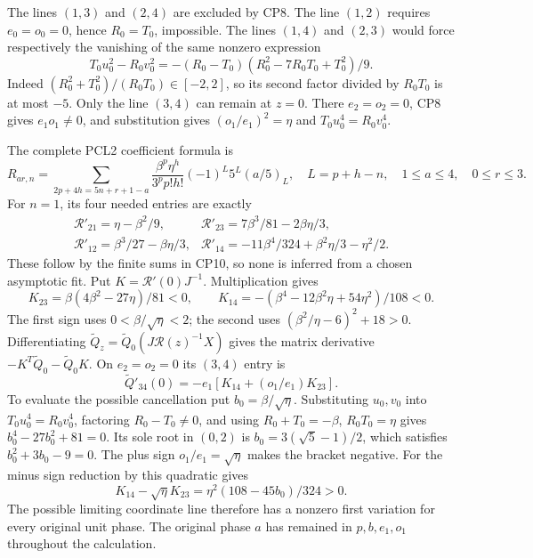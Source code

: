 The lines $(1,3)$ and $(2,4)$ are excluded by CP8. The line
$(1,2)$ requires $e_0=o_0=0$, hence $R_0=T_0$, impossible.
The lines $(1,4)$ and $(2,3)$ would force respectively the vanishing
of the same nonzero expression
\[
 T_0u_0^2-R_0v_0^2
 =-(R_0-T_0)(R_0^2-7R_0T_0+T_0^2)/9.                             \tag{CP9}
\]
Indeed $(R_0^2+T_0^2)/(R_0T_0)\in[-2,2]$, so its second factor
divided by $R_0T_0$ is at most $-5$. Only the line $(3,4)$
can remain at $z=0$. There $e_2=o_2=0$, CP8 gives $e_1o_1\ne0$,
and substitution gives $(o_1/e_1)^2=\eta$ and
$T_0u_0^4=R_0v_0^4$.

The complete PCL2 coefficient formula is
\[
 R_{ar,n}=\sum_{2p+4h=5n+r+1-a}
 \frac{\beta^p\eta^h}{3^pp!h!}(-1)^L5^L(a/5)_L,
 \quad L=p+h-n,\quad1\le a\le4,\quad0\le r\le3.                  \tag{CP10}
\]
For $n=1$, its four needed entries are exactly
\[
 \begin{array}{ll}
 \mathcal R'_{21}=\eta-\beta^2/9,
 &\mathcal R'_{23}=7\beta^3/81-2\beta\eta/3,\\
 \mathcal R'_{12}=\beta^3/27-\beta\eta/3,
 &\mathcal R'_{14}=-11\beta^4/324+\beta^2\eta/3-\eta^2/2.
 \end{array}                                                       \tag{CP11}
\]
These follow by the finite sums in CP10, so none is inferred from
a chosen asymptotic fit. Put $K=\mathcal R'(0)J^{-1}$. Multiplication
gives
\[
 K_{23}=\beta(4\beta^2-27\eta)/81<0,\qquad
 K_{14}=-(\beta^4-12\beta^2\eta+54\eta^2)/108<0.                   \tag{CP12}
\]
The first sign uses $0<\beta/\sqrt\eta<2$; the second uses
$(\beta^2/\eta-6)^2+18>0$. Differentiating
$\widetilde Q_z=\widetilde Q_0(J\mathcal R(z)^{-1}X)$ gives the
matrix derivative $-K^T\widetilde Q_0-\widetilde Q_0K$.
On $e_2=o_2=0$ its $(3,4)$ entry is
\[
 \widetilde Q'_{34}(0)=-e_1[K_{14}+(o_1/e_1)K_{23}].                \tag{CP13}
\]
To evaluate the possible cancellation put $b_0=\beta/\sqrt\eta$.
Substituting $u_0,v_0$ into $T_0u_0^4=R_0v_0^4$, factoring
$R_0-T_0\ne0$, and using $R_0+T_0=-\beta$, $R_0T_0=\eta$
gives $b_0^4-27b_0^2+81=0$. Its sole root in $(0,2)$ is
$b_0=3(\sqrt5-1)/2$, which satisfies $b_0^2+3b_0-9=0$.
The plus sign $o_1/e_1=\sqrt\eta$ makes the bracket negative.
For the minus sign reduction by this quadratic gives
\[
 K_{14}-\sqrt\eta K_{23}=\eta^2(108-45b_0)/324>0.                 \tag{CP14}
\]
The possible limiting coordinate line therefore has a nonzero first
variation for every original unit phase. The original phase $a$
has remained in $p,b,e_1,o_1$ throughout the calculation.

